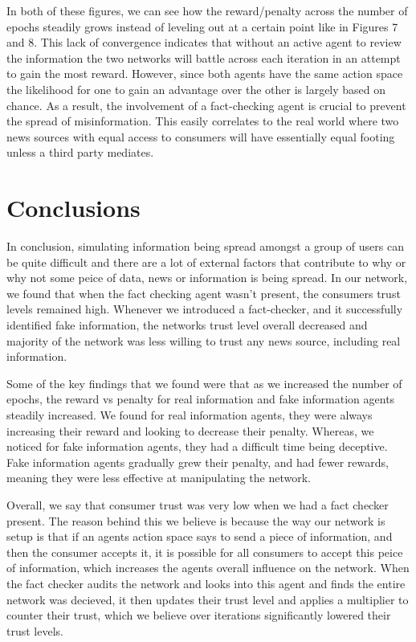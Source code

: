 \documentclass[twoside]{article}
\begin{document}
In both of these figures, we can see how the reward/penalty across the number of epochs steadily grows instead of leveling out at a certain point like in Figures 7 and 8. This lack of convergence indicates that without an active agent to review the information the two networks will battle across each iteration in an attempt to gain the most reward. However, since both agents have the same action space the likelihood for one to gain an advantage over the other is largely based on chance. As a result, the involvement of a fact-checking agent is crucial to prevent the spread of misinformation. This easily correlates to the real world where two news sources with equal access to consumers will have essentially equal footing unless a third party mediates.

\pagebreak
\section{Conclusions}
In conclusion, simulating information being spread amongst a group of users can be quite difficult and there are a lot of external factors that contribute to why or why not some peice of data, news or information is being spread. In our network, we found that when the fact checking agent wasn't present, the consumers trust levels remained high. Whenever we introduced a fact-checker, and it successfully identified fake information, the networks trust level overall decreased and majority of the network was less willing to trust any news source, including real information.

Some of the key findings that we found were that as we increased the number of epochs, the reward vs penalty for real information and fake information agents steadily increased. We found for real information agents, they were always increasing their reward and looking to decrease their penalty. Whereas, we noticed for fake information agents, they had a difficult time being deceptive. Fake information agents gradually grew their penalty, and had fewer rewards, meaning they were less effective at manipulating the network. 

Overall, we say that consumer trust was very low when we had a fact checker present. The reason behind this we believe is because the way our network is setup is that if an agents action space says to send a piece of information, and then the consumer accepts it, it is possible for all consumers to accept this peice of information, which increases the agents overall influence on the network. When the fact checker audits the network and looks into this agent and finds the entire network was decieved, it then updates their trust level and applies a multiplier to counter their trust, which we believe over iterations significantly lowered their trust levels.
\end{document}
